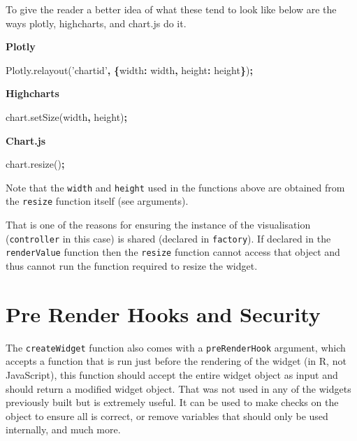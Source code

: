 \documentclass[10pt,]{krantz}
\makeatletter
\newenvironment{Shaded}{\begin{snugshade}}{\end{snugshade}}
\newcommand{\AttributeTok}[1]{\textcolor[rgb]{0.61,0.61,0.61}{#1}}
\newcommand{\DataTypeTok}[1]{\textcolor[rgb]{0.27,0.27,0.27}{#1}}
\newcommand{\NormalTok}[1]{#1}
\newcommand{\OperatorTok}[1]{\textcolor[rgb]{0.43,0.43,0.43}{\textbf{#1}}}
\newcommand{\StringTok}[1]{\textcolor[rgb]{0.5,0.5,0.5}{#1}}
\newcommand{\VariableTok}[1]{\textcolor[rgb]{0,0,0}{#1}}
\newenvironment{kframe}{%
\medskip{}
\setlength{\fboxsep}{.8em}
 \def\at@end@of@kframe{}%
 \ifinner\ifhmode%
  \def\at@end@of@kframe{\end{minipage}}%
  \begin{minipage}{\columnwidth}%
 \fi\fi%
 \def\FrameCommand##1{\hskip\@totalleftmargin \hskip-\fboxsep
 \colorbox{shadecolor}{##1}\hskip-\fboxsep
     \hskip-\linewidth \hskip-\@totalleftmargin \hskip\columnwidth}%
 \MakeFramed {\advance\hsize-\width
   \@totalleftmargin\z@ \linewidth\hsize
   \@setminipage}}%
 {\par\unskip\endMakeFramed%
 \at@end@of@kframe}
\renewenvironment{Shaded}{\begin{kframe}}{\end{kframe}}
\makeatother
\begin{document}
To give the reader a better idea of what these tend to look like below are the ways plotly, highcharts, and chart.js do it.

\textbf{Plotly}

\begin{Shaded}
\begin{Highlighting}[]
\VariableTok{Plotly}\NormalTok{.}\AttributeTok{relayout}\NormalTok{(}\StringTok{'chartid'}\OperatorTok{,} \OperatorTok{\{}\DataTypeTok{width}\OperatorTok{:}\NormalTok{ width}\OperatorTok{,} \DataTypeTok{height}\OperatorTok{:}\NormalTok{ height}\OperatorTok{\}}\NormalTok{)}\OperatorTok{;}
\end{Highlighting}
\end{Shaded}

\textbf{Highcharts}

\begin{Shaded}
\begin{Highlighting}[]
\VariableTok{chart}\NormalTok{.}\AttributeTok{setSize}\NormalTok{(width}\OperatorTok{,}\NormalTok{ height)}\OperatorTok{;}
\end{Highlighting}
\end{Shaded}

\textbf{Chart.js}

\begin{Shaded}
\begin{Highlighting}[]
\VariableTok{chart}\NormalTok{.}\AttributeTok{resize}\NormalTok{()}\OperatorTok{;}
\end{Highlighting}
\end{Shaded}

Note that the \texttt{width} and \texttt{height} used in the functions above are obtained from the \texttt{resize} function itself (see arguments).

That is one of the reasons for ensuring the instance of the visualisation (\texttt{controller} in this case) is shared (declared in \texttt{factory}). If declared in the \texttt{renderValue} function then the \texttt{resize} function cannot access that object and thus cannot run the function required to resize the widget.

\hypertarget{widgets-adv-prerender}{%
\section{Pre Render Hooks and Security}\label{widgets-adv-prerender}}

The \texttt{createWidget} function also comes with a \texttt{preRenderHook} argument, which accepts a function that is run just before the rendering of the widget (in R, not JavaScript), this function should accept the entire widget object as input and should return a modified widget object. That was not used in any of the widgets previously built but is extremely useful. It can be used to make checks on the object to ensure all is correct, or remove variables that should only be used internally, and much more.
\end{document}
